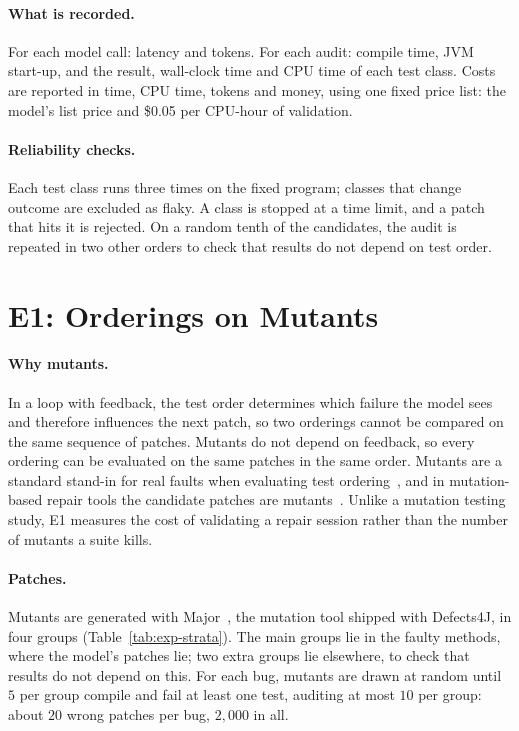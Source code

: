 \paragraph{What is recorded.} For each model call: latency and tokens. For each
audit: compile time, JVM start-up, and the result, wall-clock time and CPU
time of each test class. Costs are reported in time, CPU time, tokens and
money, using one fixed price list: the model's list price and \$0.05 per
CPU-hour of validation.

\paragraph{Reliability checks.} Each test class runs three times on the fixed
program; classes that change outcome are excluded as flaky. A class is stopped
at a time limit, and a patch that hits it is rejected. On a random tenth of the
candidates, the audit is repeated in two other orders to check that results do
not depend on test order.

\section{E1: Orderings on Mutants}
\label{sec:exp-e1}

\paragraph{Why mutants.} In a loop with feedback, the test order determines which failure the model
sees and therefore influences the next patch, so two orderings cannot be
compared on the same sequence of patches. Mutants do not depend on feedback,
so every ordering can be evaluated on the same patches in the same order.
Mutants are a standard stand-in for real faults when evaluating test
ordering~\citep{do2006mutation}, and in mutation-based repair tools the
candidate patches are mutants~\citep{ghanbari2019prapr}. Unlike a mutation testing study, E1 measures the cost of validating a repair
session rather than the number of mutants a suite kills.

\paragraph{Patches.} Mutants are generated with Major~\citep{just2014major},
the mutation tool shipped with Defects4J, in four groups
(Table~\ref{tab:exp-strata}). The main groups lie in the faulty methods, where
the model's patches lie; two extra groups lie elsewhere, to check that results
do not depend on this. For each bug, mutants are drawn at random until $5$ per
group compile and fail at least one test, auditing at most $10$ per group: about
$20$ wrong patches per bug, $2{,}000$ in all.

